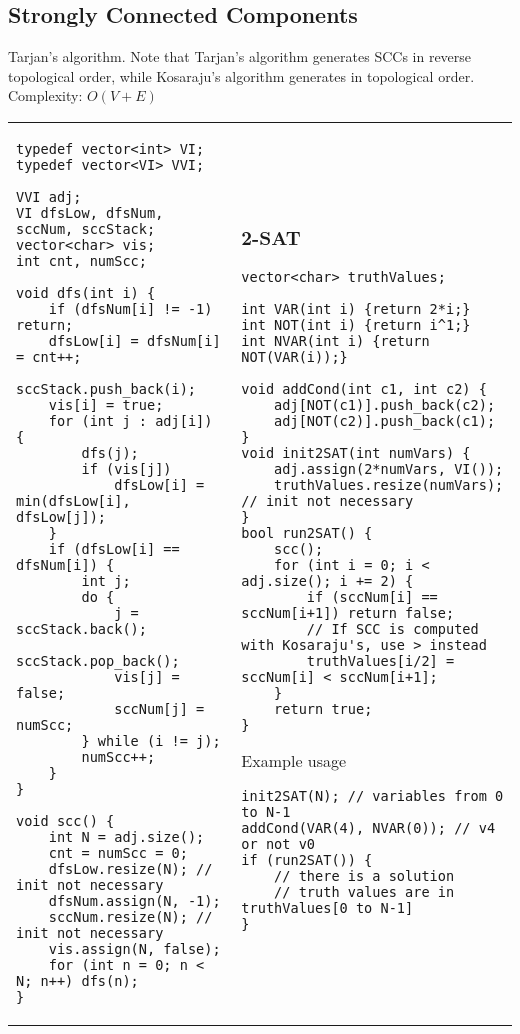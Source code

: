 \documentclass[letterpaper]{article}
\begin{document}
\subsection{Strongly Connected Components}

Tarjan's algorithm. Note that Tarjan's algorithm generates SCCs in reverse topological order, while Kosaraju's algorithm generates in topological order. Complexity: $O\left(V + E\right)$

\begin{tabular}{@{}p{9cm}p{9cm}@{}}

    \begin{lstlisting}
typedef vector<int> VI;
typedef vector<VI> VVI;

VVI adj;
VI dfsLow, dfsNum, sccNum, sccStack;
vector<char> vis;
int cnt, numScc;

void dfs(int i) {
	if (dfsNum[i] != -1) return;
	dfsLow[i] = dfsNum[i] = cnt++;
	sccStack.push_back(i);
	vis[i] = true;
	for (int j : adj[i]) {
		dfs(j);
		if (vis[j])
			dfsLow[i] = min(dfsLow[i], dfsLow[j]);
	}
	if (dfsLow[i] == dfsNum[i]) {
		int j;
		do {
			j = sccStack.back();
			sccStack.pop_back();
			vis[j] = false;
			sccNum[j] = numScc;
		} while (i != j);
		numScc++;
	}
}

void scc() {
	int N = adj.size();
	cnt = numScc = 0;
	dfsLow.resize(N); // init not necessary
	dfsNum.assign(N, -1);
	sccNum.resize(N); // init not necessary
	vis.assign(N, false);
	for (int n = 0; n < N; n++) dfs(n);
}
\end{lstlisting}
     &
    \subsubsection{2-SAT}
    \begin{lstlisting}
vector<char> truthValues;

int VAR(int i) {return 2*i;}
int NOT(int i) {return i^1;}
int NVAR(int i) {return NOT(VAR(i));}

void addCond(int c1, int c2) {
	adj[NOT(c1)].push_back(c2);
	adj[NOT(c2)].push_back(c1);
}
void init2SAT(int numVars) {
	adj.assign(2*numVars, VI());
	truthValues.resize(numVars); // init not necessary
}
bool run2SAT() {
	scc();
	for (int i = 0; i < adj.size(); i += 2) {
		if (sccNum[i] == sccNum[i+1]) return false;
		// If SCC is computed with Kosaraju's, use > instead
		truthValues[i/2] = sccNum[i] < sccNum[i+1];
	}
	return true;
}
\end{lstlisting}
    Example usage
    \begin{lstlisting}
init2SAT(N); // variables from 0 to N-1
addCond(VAR(4), NVAR(0)); // v4 or not v0
if (run2SAT()) {
	// there is a solution
	// truth values are in truthValues[0 to N-1]
}
\end{lstlisting}
\end{tabular}
\end{document}
